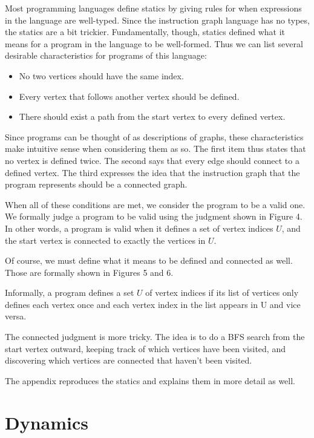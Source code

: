 \documentclass{sig-alternate-05-2015}
\begin{document}
Most programming languages define statics by giving rules for when expressions
in the language are well-typed. Since the instruction graph language has no
types, the statics are a bit trickier. Fundamentally, though, statics defined
what it means for a program in the language to be well-formed. Thus we can list
several desirable characteristics for programs of this language:

\begin{itemize}
  \item No two vertices should have the same index.
  \item Every vertex that follows another vertex should be defined.
  \item There should exist a path from the start vertex to every defined vertex.
\end{itemize}

Since programs can be thought of as descriptions of graphs, these
characteristics make intuitive sense when considering them as so. The first item
thus states that no vertex is defined twice. The second says that every edge
should connect to a defined vertex. The third expresses the idea that the
instruction graph that the program represents should be a connected graph.

When all of these conditions are met, we consider the program to be a valid one.
We formally judge a program to be valid using the judgment shown in Figure 4. In
other words, a program is valid when it defines a set of vertex indices $U$, and
the start vertex is connected to exactly the vertices in $U$.

Of course, we must define what it means to be defined and connected as well.
Those are formally shown in Figures 5 and 6.

Informally, a program defines a set $U$ of vertex indices if its list of
vertices only defines each vertex once and each vertex index in the list appears
in U and vice versa.

The connected judgment is more tricky. The idea is to do a BFS search from the
start vertex outward, keeping track of which vertices have been visited, and
discovering which vertices are connected that haven't been visited.

The appendix reproduces the statics and explains them in more detail as well.

\section{Dynamics}
\end{document}
